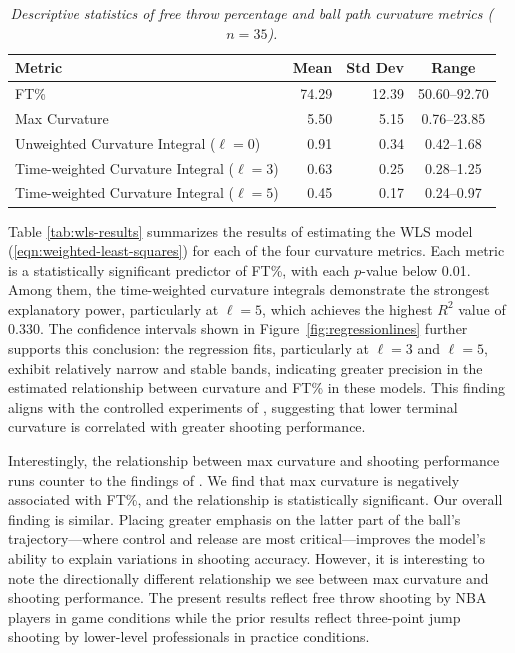 \documentclass{article}
\begin{document}
    \begin{table}[H]
        \centering
        \begin{tabular}{lrrc}
        \toprule
        \textbf{Metric} & \textbf{Mean} & \textbf{Std Dev} & \textbf{Range} \\
        \midrule
        FT\% & 74.29 & 12.39 & 50.60--92.70 \\
        Max Curvature & 5.50 & 5.15 & 0.76--23.85 \\
        Unweighted Curvature Integral ($\ell=0$) & 0.91 & 0.34 & 0.42--1.68 \\
        Time-weighted Curvature Integral ($\ell=3$) & 0.63 & 0.25 & 0.28--1.25 \\
        Time-weighted Curvature Integral ($\ell=5$) & 0.45 & 0.17 & 0.24--0.97 \\
        \bottomrule
        \end{tabular}
        \caption{\it Descriptive statistics of free throw percentage and ball path curvature metrics ($n = 35$).}
        \label{tab:summary-stats}
    \end{table}

    Table \ref{tab:wls-results} summarizes the results of estimating the WLS model (\ref{eqn:weighted-least-squares}) for each of the four curvature metrics. Each metric is a statistically significant predictor of FT\%, with each $p$-value below 0.01. Among them, the time-weighted curvature integrals demonstrate the strongest explanatory power, particularly at $\ell = 5$, which achieves the highest $R^2$ value of 0.330. The confidence intervals shown in Figure~\ref{fig:regressionlines} further supports this conclusion: the regression fits, particularly at $\ell = 3$ and $\ell = 5$, exhibit relatively narrow and stable bands, indicating greater precision in the estimated relationship between curvature and FT\% in these models. This finding aligns with the controlled experiments of \citet{slegers_role_2024}, suggesting that lower terminal curvature is correlated with greater shooting performance.

    Interestingly, the relationship between max curvature and shooting performance runs counter to the findings of \citet{slegers_role_2024}. We find that max curvature is negatively associated with FT\%, and the relationship is statistically significant. Our overall finding is similar. Placing greater emphasis on the latter part of the ball's trajectory---where control and release are most critical---improves the model's ability to explain variations in shooting accuracy. However, it is interesting to note the directionally different relationship we see between max curvature and shooting performance. The present results reflect free throw shooting by NBA players in game conditions while the prior results reflect three-point jump shooting by lower-level professionals in practice conditions.
    
\end{document}
